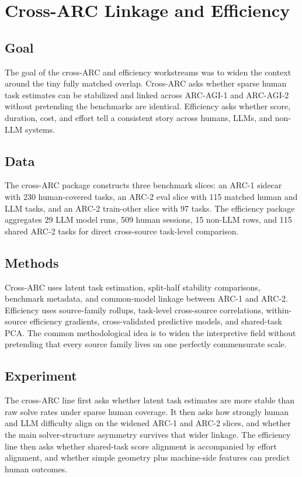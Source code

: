 \section{Cross-ARC Linkage and Efficiency}

\subsection{Goal}

The goal of the cross-ARC and efficiency workstreams was to widen the context around the tiny fully matched overlap. Cross-ARC asks whether sparse human task estimates can be stabilized and linked across ARC-AGI-1 and ARC-AGI-2 without pretending the benchmarks are identical. Efficiency asks whether score, duration, cost, and effort tell a consistent story across humans, LLMs, and non-LLM systems.

\subsection{Data}

The cross-ARC package constructs three benchmark slices: an ARC-1 sidecar with 230 human-covered tasks, an ARC-2 eval slice with 115 matched human and LLM tasks, and an ARC-2 train-other slice with 97 tasks. The efficiency package aggregates 29 LLM model runs, 509 human sessions, 15 non-LLM rows, and 115 shared ARC-2 tasks for direct cross-source task-level comparison.

\subsection{Methods}

Cross-ARC uses latent task estimation, split-half stability comparisons, benchmark metadata, and common-model linkage between ARC-1 and ARC-2. Efficiency uses source-family rollups, task-level cross-source correlations, within-source efficiency gradients, cross-validated predictive models, and shared-task PCA. The common methodological idea is to widen the interpretive field without pretending that every source family lives on one perfectly commensurate scale.

\subsection{Experiment}

The cross-ARC line first asks whether latent task estimates are more stable than raw solve rates under sparse human coverage. It then asks how strongly human and LLM difficulty align on the widened ARC-1 and ARC-2 slices, and whether the main solver-structure asymmetry survives that wider linkage. The efficiency line then asks whether shared-task score alignment is accompanied by effort alignment, and whether simple geometry plus machine-side features can predict human outcomes.

